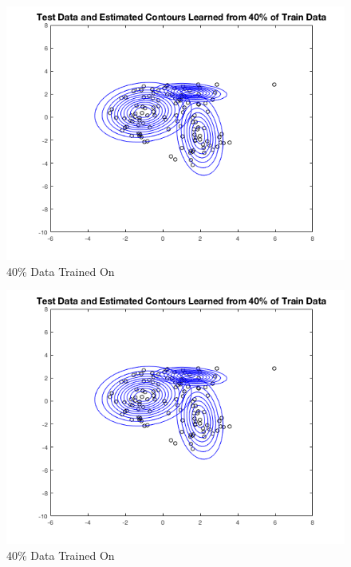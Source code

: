 \documentclass[english]{article}
\begin{document}
\begin{enumerate}
\begin{enumerate}
	\begin{figure}[H]
        \centering
    	\includegraphics[scale = 0.5]{3_1_b_40}
    	\caption{40\% Data Trained On}
    	\label{fig:3_1_b_40}
    	\end{figure}
	
	\begin{figure}[H]
        \centering
    	\includegraphics[scale = 0.5]{3_1_b_40}
    	\caption{40\% Data Trained On}
    	\label{fig:3_1_b_40}
    	\end{figure}
	

\end{enumerate}
\end{enumerate}
\end{document}
